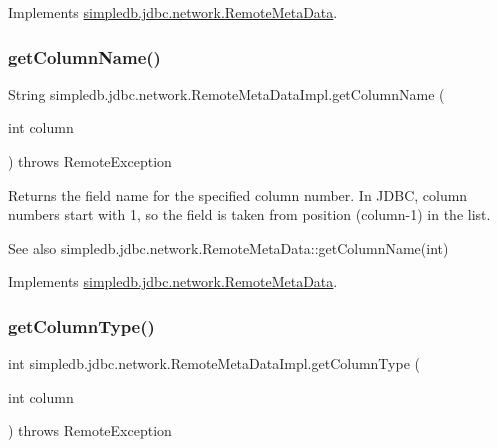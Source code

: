 Implements \hyperlink{interfacesimpledb_1_1jdbc_1_1network_1_1RemoteMetaData}{simpledb.\+jdbc.\+network.\+Remote\+Meta\+Data}.

\mbox{\label{classsimpledb_1_1jdbc_1_1network_1_1RemoteMetaDataImpl_a94a385bd9190b10c3a865f17a53978d6}} 
\subsubsection{\texorpdfstring{get\+Column\+Name()}{getColumnName()}}
{\footnotesize\ttfamily String simpledb.\+jdbc.\+network.\+Remote\+Meta\+Data\+Impl.\+get\+Column\+Name (\begin{DoxyParamCaption}\item[{int}]{column }\end{DoxyParamCaption}) throws Remote\+Exception\hspace{0.3cm}{\ttfamily [inline]}}

Returns the field name for the specified column number. In J\+D\+BC, column numbers start with 1, so the field is taken from position (column-\/1) in the list. \begin{DoxySeeAlso}{See also}
simpledb.\+jdbc.\+network.\+Remote\+Meta\+Data\+::get\+Column\+Name(int) 
\end{DoxySeeAlso}


Implements \hyperlink{interfacesimpledb_1_1jdbc_1_1network_1_1RemoteMetaData}{simpledb.\+jdbc.\+network.\+Remote\+Meta\+Data}.

\mbox{\label{classsimpledb_1_1jdbc_1_1network_1_1RemoteMetaDataImpl_a9b478868603ba76bdb7ef16f7c483236}} 
\subsubsection{\texorpdfstring{get\+Column\+Type()}{getColumnType()}}
{\footnotesize\ttfamily int simpledb.\+jdbc.\+network.\+Remote\+Meta\+Data\+Impl.\+get\+Column\+Type (\begin{DoxyParamCaption}\item[{int}]{column }\end{DoxyParamCaption}) throws Remote\+Exception\hspace{0.3cm}{\ttfamily [inline]}}

